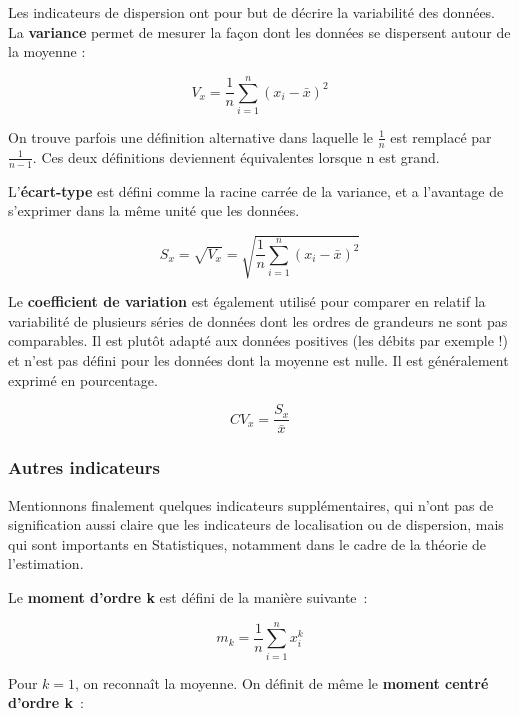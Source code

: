 \documentclass[
]{book}
\begin{document}
Les indicateurs de dispersion ont pour but de décrire la variabilité des données.
La \textbf{variance} permet de mesurer la façon dont les données se dispersent autour de la moyenne :

\begin{equation} 
V_x=\frac{1}{n}\sum_{i=1}^{n}(x_i-\bar{x})^2
\label{eq:var}
\end{equation}

On trouve parfois une définition alternative dans laquelle le \(\frac{1}{n}\) est remplacé par \(\frac{1}{n-1}\). Ces deux définitions deviennent équivalentes lorsque n est grand.

L'\textbf{écart-type} est défini comme la racine carrée de la variance, et a l'avantage de s'exprimer dans la même unité que les données.

\begin{equation} 
S_x=\sqrt{V_x}= \sqrt{\frac{1}{n}\sum_{i=1}^{n}(x_i-\bar{x})^2}
\label{eq:sdev}
\end{equation}

Le \textbf{coefficient de variation} est également utilisé pour comparer en relatif la variabilité de plusieurs séries de données dont les ordres de grandeurs ne sont pas comparables. Il est plutôt adapté aux données positives (les débits par exemple !) et n'est pas défini pour les données dont la moyenne est nulle. Il est généralement exprimé en pourcentage.

\begin{equation} 
CV_x=\frac{S_x}{\bar{x}}
\label{eq:cv}
\end{equation}

\subsubsection{Autres indicateurs}\label{autres-indicateurs}

Mentionnons finalement quelques indicateurs supplémentaires, qui n'ont pas de signification aussi claire que les indicateurs de localisation ou de dispersion, mais qui sont importants en Statistiques, notamment dans le cadre de la théorie de l'estimation.

Le \textbf{moment d'ordre k} est défini de la manière suivante~:

\begin{equation} 
m_k=\frac{1}{n}\sum_{i=1}^{n}x_i^k
\label{eq:moment}
\end{equation}

Pour \(k=1\), on reconnaît la moyenne. On définit de même le \textbf{moment centré d'ordre k}~:
\end{document}
